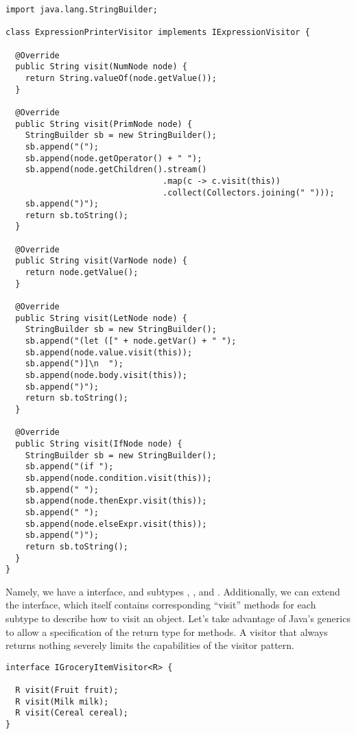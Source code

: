 \begin{lstlisting}[language=MyJava]
import java.lang.StringBuilder; 

class ExpressionPrinterVisitor implements IExpressionVisitor {

  @Override
  public String visit(NumNode node) {
    return String.valueOf(node.getValue());
  }
  
  @Override
  public String visit(PrimNode node) {
    StringBuilder sb = new StringBuilder();
    sb.append("(");
    sb.append(node.getOperator() + " ");
    sb.append(node.getChildren().stream()
                                .map(c -> c.visit(this))
                                .collect(Collectors.joining(" ")));
    sb.append(")");
    return sb.toString();
  }
  
  @Override
  public String visit(VarNode node) {
    return node.getValue();
  }
  
  @Override
  public String visit(LetNode node) {
    StringBuilder sb = new StringBuilder();
    sb.append("(let ([" + node.getVar() + " ");
    sb.append(node.value.visit(this));
    sb.append(")]\n  ");
    sb.append(node.body.visit(this));
    sb.append(")");
    return sb.toString();
  }
  
  @Override
  public String visit(IfNode node) {
    StringBuilder sb = new StringBuilder();
    sb.append("(if ");
    sb.append(node.condition.visit(this));
    sb.append(" ");
    sb.append(node.thenExpr.visit(this));
    sb.append(" ");
    sb.append(node.elseExpr.visit(this));
    sb.append(")");
    return sb.toString();
  }
}
\end{lstlisting}

Namely, we have a  interface, and subtypes , , and . 
Additionally, we can extend the  interface, which itself contains corresponding ``visit'' methods for each subtype to describe how to visit an  object. 
Let's take advantage of Java's generics to allow a specification of the return type for  methods. 
A visitor that always returns nothing severely limits the capabilities of the visitor pattern.

\begin{lstlisting}[language=MyJava]
interface IGroceryItemVisitor<R> {

  R visit(Fruit fruit);
  R visit(Milk milk);
  R visit(Cereal cereal);
}
\end{lstlisting}


